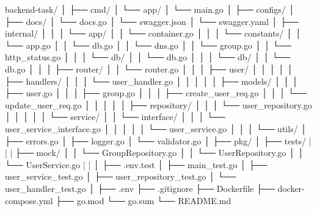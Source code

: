 backend-task/
│
├── cmd/
│   └── app/
│       └── main.go 
│
├── configs/
│
├── docs/
│     └── docs.go 
│     └── swagger.json 
│     └── swagger.yaml 
│
├── internal/
│   │ 
│   └── app/
│   │   └── container.go 
│   │ 
│   └── constants/
│   │   └── app.go 
│   │   └── db.go 
│   │   └── dns.go 
│   │   └── group.go 
│   │   └── http_status.go 
│   │ 
│   └── db/
│   │   └── db.go 
│   │ 
│   └── db/
│   │   └── db.go 
│   │ 
│   ├── router/
│   │   └── router.go    
│   │
│   ├── user/
│   │   │ 
│   │   ├── handlers/
│   │   │   └── user_handler.go
│   │   │   
│   │   ├── models/
│   │   │   ├── user.go
│   │   │   ├── group.go
│   │   │   ├── create_user_req.go
│   │   │   └── update_user_req.go
│   │   │   
│   │   ├── repository/
│   │   │   └── user_repository.go
│   │   │   
│   │   └── service/
│   │       └── interface/
│   │       │     └── user_service_interface.go
│   │       │
│   │       └── user_service.go
│   │
│   └── utils/
│       ├── errors.go
│       ├── logger.go
│       └── validator.go
│ 
├── pkg/
│
├── tests/
|   |
|   ├── mock/
│   │    └── GroupRepository.go
│   │    └── UserRepository.go
│   │    └── UserService.go
|   |
│   ├── .env.test
│   ├── main_test.go
│   ├── user_service_test.go
│   ├── user_repository_test.go
│   └── user_handler_test.go
│
├── .env
├── .gitignore
├── Dockerfile
├── docker-compose.yml
├── go.mod
└── go.sum
└── README.md
